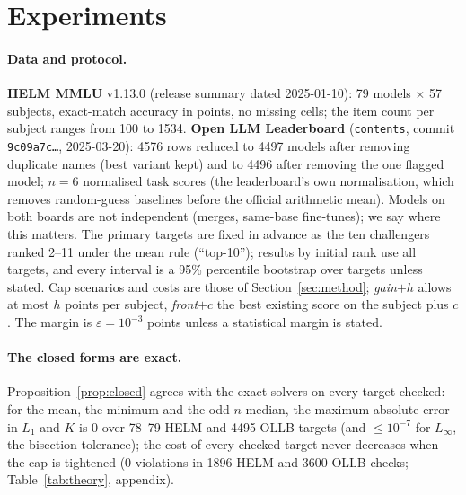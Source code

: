 \section{Experiments}
\label{sec:exp}

\paragraph{Data and protocol.}
\textbf{HELM MMLU} v1.13.0 (release summary dated 2025-01-10): 79 models $\times$ 57 subjects, exact-match accuracy in points, no missing cells; the item count per subject ranges from 100 to 1534. \textbf{Open LLM Leaderboard} (\texttt{contents}, commit \texttt{9c09a7c\ldots}, 2025-03-20): 4576 rows reduced to 4497 models after removing duplicate names (best variant kept) and to 4496 after removing the one flagged model; $n=6$ normalised task scores (the leaderboard's own normalisation, which removes random-guess baselines before the official arithmetic mean). Models on both boards are not independent (merges, same-base fine-tunes); we say where this matters. The primary targets are fixed in advance as the ten challengers ranked 2--11 under the mean rule (``top-10''); results by initial rank use all targets, and every interval is a 95\% percentile bootstrap over targets unless stated. Cap scenarios and costs are those of Section~\ref{sec:method}; \emph{gain}$+h$ allows at most $h$ points per subject, \emph{front}$+c$ the best existing score on the subject plus $c$. The margin is $\varepsilon=10^{-3}$ points unless a statistical margin is stated.

\paragraph{The closed forms are exact.}
Proposition~\ref{prop:closed} agrees with the exact solvers on every target checked: for the mean, the minimum and the odd-$n$ median, the maximum absolute error in $L_1$ and $K$ is $0$ over 78--79 HELM and 4495 OLLB targets (and $\le 10^{-7}$ for $L_\infty$, the bisection tolerance); the cost of every checked target never decreases when the cap is tightened (0 violations in 1896 HELM and 3600 OLLB checks; Table~\ref{tab:theory}, appendix).

